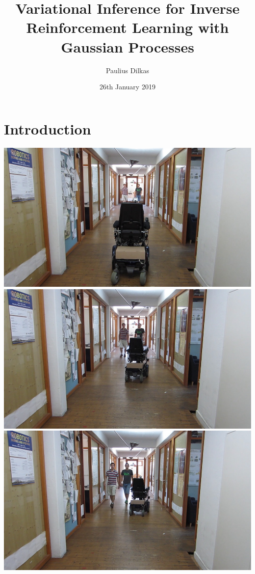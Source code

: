 \documentclass{beamer}
\author{Paulius Dilkas}
\title{Variational Inference for Inverse Reinforcement Learning with Gaussian
  Processes}
\date{26th January 2019}
\begin{document}
\maketitle

\section{Introduction}

\begin{frame}
  \begin{overprint}
    \includegraphics[width=\textwidth]{images/image-044.jpg}
    \includegraphics[width=\textwidth]{images/image-045.jpg}
    \includegraphics[width=\textwidth]{images/image-048.jpg}

\end{overprint}
\end{frame}
\end{document}
